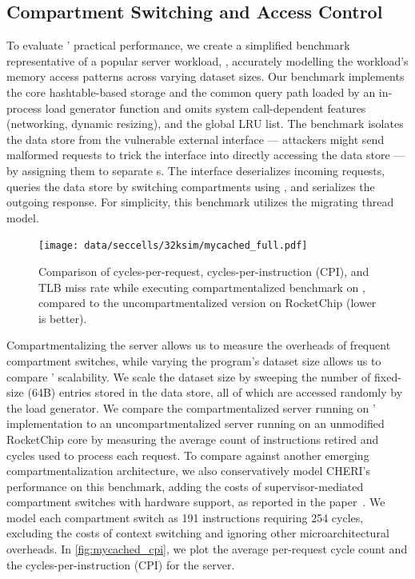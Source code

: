 \subsection{Compartment Switching and Access Control}
To evaluate \seccells' practical performance, we create a simplified 
benchmark representative of a popular server workload, 
, accurately modelling the workload's memory access 
patterns across varying dataset sizes.
Our benchmark implements the core hashtable-based storage and the 
common query path loaded by an in-process load generator function
and omits system call-dependent features (networking, dynamic resizing),
and the global LRU list.
The benchmark isolates the data store from the vulnerable external interface
--- attackers might send malformed requests to trick the interface into directly
accessing the data store ---
by assigning them to separate \secdiv{}s.
The interface deserializes incoming requests, queries the data store
by switching compartments using \sdswitch, and serializes the
outgoing response.
For simplicity, this benchmark utilizes the migrating thread model.

\begin{figure}
  \centering
  \texttt{[image: data/seccells/32ksim/mycached\_full.pdf]}
  \caption[\seccells performance comparison: ]
          {Comparison of cycles-per-request,   
          cycles-per-instruction (CPI), and
          TLB miss rate
          while executing compartmentalized  benchmark on 
          \seccells, compared to the uncompartmentalized version on RocketChip
          (lower is better).
          }
  \label{fig:mycached_cpi}
\end{figure}

Compartmentalizing the server allows us to measure the overheads
of frequent compartment switches, while varying the program's
dataset size allows us to compare \seccells' scalability.
We scale the dataset size by sweeping the number of fixed-size (64B)
entries stored in the data store, all of which are accessed randomly
by the load generator.
We compare the compartmentalized server running on \seccells'
implementation to an uncompartmentalized server running on
an unmodified RocketChip core by measuring the average count of
instructions retired and cycles used to process each request.
To compare against another emerging compartmentalization architecture,
we also conservatively model CHERI's performance on this benchmark,
adding the costs of supervisor-mediated compartment
switches with hardware support, as reported in the paper~\cite{WatsonWNMACDDGL15}.
We model each compartment switch as 191 instructions requiring 254 cycles,
excluding the costs of context switching and
ignoring other microarchitectural overheads.
In \autoref{fig:mycached_cpi}, we plot the average per-request 
cycle count and the cycles-per-instruction (CPI) for the server.

